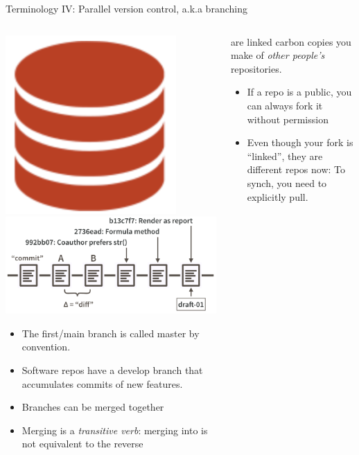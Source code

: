 \documentclass[ignorenonframetext, 10pt, aspectratio=169]{beamer}
\begin{document}
\begin{frame}{Terminology IV: Parallel version control, a.k.a branching}
\begin{columns}[T]
\begin{column}{0.5\textwidth}

\centering
\includegraphics[width =0.25\linewidth]{repo-0.png} \hspace{-1em}~ \includegraphics[width =0.5\linewidth]{commit-diff-sha-tag.png}

\small
\begin{itemize}
  \item The first/main branch is called \alert{master} by convention. \pause
  \item Software repos have a \alert{develop} branch that accumulates commits of new features.\pause
  \item Branches can be \alert{merged} together
  \item Merging is a \emph{transitive verb}: merging  into  is not equivalent to the reverse
\end{itemize}
\end{column}


\begin{column}{0.25\textwidth}
are linked carbon copies you make of \emph{other people's} repositories.\\


\small
\begin{itemize}
\item If a repo is a public, you can always fork it without permission
\item Even though your fork is ``linked'', they are different repos now: To synch, you need to explicitly pull.
\end{itemize}



\end{column}
\end{columns}
\end{frame}
\end{document}
